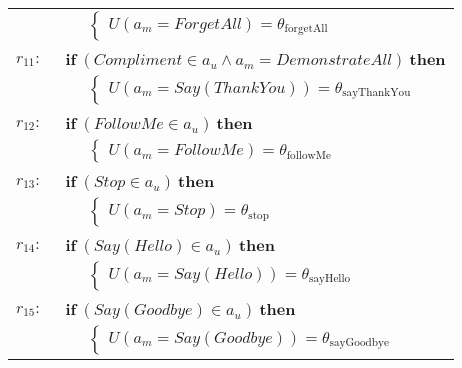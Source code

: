 \begin{footnotesize}
\begin{longtable}{p{1cm}l}
& $\;\;\;\;\; \begin{cases}U(\mathit{a_m}\!=\!\mathit{ForgetAll})\!=\!\theta_{\mathrm{forgetAll}}\end{cases}$ \\ \\[-1mm]
$r_{11}: \ \ $& $\textbf{if} \ (\mathit{Compliment}\!\in\!\mathit{a_u} \land \mathit{a_m}\!=\!\mathit{DemonstrateAll}) \ \textbf{then}$ \\
& $\;\;\;\;\; \begin{cases}U(\mathit{a_m}\!=\!\mathit{Say(ThankYou)})\!=\!\theta_{\mathrm{sayThankYou}}\end{cases}$ \\ \\[-1mm]
$r_{12}: \ \ $& $\textbf{if} \ (\mathit{FollowMe}\!\in\!\mathit{a_u}) \ \textbf{then}$ \\
& $\;\;\;\;\; \begin{cases}U(\mathit{a_m}\!=\!\mathit{FollowMe})\!=\!\theta_{\mathrm{followMe}}\end{cases}$  \vspace{1mm} \\  \\[-2mm]
$r_{13}: \ \ $& $\textbf{if} \ (\mathit{Stop}\!\in\!\mathit{a_u}) \ \textbf{then} $\\
& $\;\;\;\;\; \begin{cases}U(\mathit{a_m}\!=\!\mathit{Stop})\!=\!\theta_{\mathrm{stop}}\end{cases} $ \vspace{1mm} \\  \\[-2mm]
$r_{14}: \ \ $&$ \textbf{if} \ (\mathit{Say(Hello)}\!\in\!\mathit{a_u}) \ \textbf{then} $\\
& $\;\;\;\;\; \begin{cases}U(\mathit{a_m}\!=\!\mathit{Say(Hello)})\!=\!\theta_{\mathrm{sayHello}}\end{cases}$  \vspace{1mm} \\  \\[-2mm]
$r_{15}: \ \ $&$ \textbf{if} \ (\mathit{Say(Goodbye)}\!\in\!\mathit{a_u}) \ \textbf{then} $\\
& $\;\;\;\;\; \begin{cases}U(\mathit{a_m}\!=\!\mathit{Say(Goodbye)})\!=\!\theta_{\mathrm{sayGoodbye}}\end{cases}$    \vspace{1mm} \\ 
\end{longtable}
\end{footnotesize}

